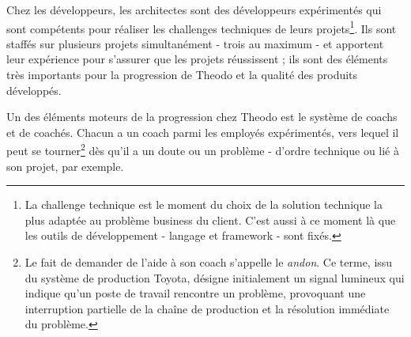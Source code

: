 Chez les développeurs, les architectes sont des développeurs expérimentés qui sont compétents pour réaliser les challenges techniques de leurs projets\footnote{La challenge technique est le moment du choix de la solution technique la plus adaptée au problème \foreignlanguage{english}{business} du client. C'est aussi à ce moment là que les outils de développement - langage et \foreignlanguage{english}{framework} - sont fixés.}. Ils sont staffés sur plusieurs projets simultanément - trois au maximum - et apportent leur expérience pour s'assurer que les projets réussissent ; ils sont des éléments très importants pour la progression de Theodo et la qualité des produits développés.

Un des éléments moteurs de la progression chez Theodo est le système de coachs et de coachés. Chacun a un coach parmi les employés expérimentés, vers lequel il peut se tourner\footnote{Le fait de demander de l'aide à son coach s'appelle le \textit{andon}. Ce terme, issu du système de production Toyota, désigne initialement un signal lumineux qui indique qu'un poste de travail rencontre un problème, provoquant une interruption partielle de la chaîne de production et la résolution immédiate du problème.} dès qu'il a un doute ou un problème - d'ordre technique ou lié à son projet, par exemple.
